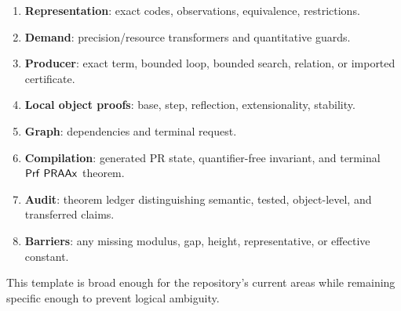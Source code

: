 \begin{enumerate}
\item \textbf{Representation}: exact codes, observations, equivalence, restrictions.
\item \textbf{Demand}: precision/resource transformers and quantitative guards.
\item \textbf{Producer}: exact term, bounded loop, bounded search, relation, or imported certificate.
\item \textbf{Local object proofs}: base, step, reflection, extensionality, stability.
\item \textbf{Graph}: dependencies and terminal request.
\item \textbf{Compilation}: generated PR state, quantifier-free invariant, and terminal \(\mathsf{Prf}\ \mathsf{PRAAx}\) theorem.
\item \textbf{Audit}: theorem ledger distinguishing semantic, tested, object-level, and transferred claims.
\item \textbf{Barriers}: any missing modulus, gap, height, representative, or effective constant.
\end{enumerate}

This template is broad enough for the repository's current areas while remaining specific enough to prevent logical ambiguity.
